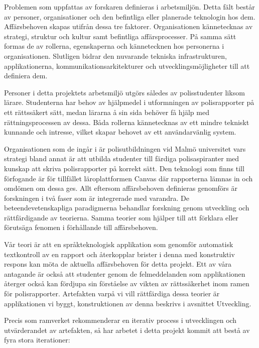 \documentclass[swedish]{maucsthesis}
\begin{document}
Problemen som uppfattas av forskaren definieras i arbetsmiljön. Detta fält
består av personer, organisationer och den befintliga eller planerade teknologin
hos dem. Affärsbehoven skapas utifrån dessa tre faktorer. Organisationen
kännetecknas av strategi, struktur och kultur samt befintliga affärsprocesser.
På samma sätt formas de av rollerna, egenskaperna och kännetecknen hos
personerna i organisationen. Slutligen bidrar den nuvarande tekniska
infrastrukturen, applikationerna, kommunikationsarkitekturer och
utvecklingsmöjligheter till att definiera dem.

Personer i detta projektets arbetsmiljö utgörs således av polisstudenter liksom
lärare. Studenterna har behov av hjälpmedel i utformningen av polisrapporter på
ett rättssäkert sätt, medan lärarna å sin sida behöver få hjälp med
rättningsprocessen av dessa. Båda rollerna kännetecknas av ett mindre tekniskt
kunnande och intresse, vilket skapar behovet av ett användarvänlig system.

Organisationen som de ingår i är polisutbildningen vid Malmö universitet vars
strategi bland annat är att utbilda studenter till färdiga polisaspiranter med
kunskap att skriva polisrapporter på korrekt sätt. Den teknologi som finns till
förfogande är för tillfället läroplattformen Canvas där rapporterna lämnas in
och omdömen om dessa ges. Allt eftersom affärsbehoven definieras genomförs är
forskningen i två faser som är integrerade med varandra. De
beteendevetenskapliga paradigmerna behandlar forskning genom utveckling och
rättfärdigande av teorierna. Samma teorier som hjälper till att förklara eller
förutsäga fenomen i förhållande till affärsbehoven.

Vår teori är att en språkteknologisk applikation som genomför automatisk
textkontroll av en rapport och återkopplar brister i denna med konstruktiv
respons kan möta de aktuella affärsbehoven för detta projekt. Ett av våra
antagande är också att studenter genom de felmeddelanden som applikationen
återger också kan fördjupa sin förståelse av vikten av rättssäkerhet inom ramen
för polisrapporter. Artefakten varpå vi vill rättfärdiga dessa teorier är
applikationen vi byggt, konstruktionen av denna beskrivs i avsnittet Utveckling.

Precis som ramverket rekommenderar en iterativ process i utvecklingen och
utvärderandet av artefakten, så har arbetet i detta projekt kommit att bestå av
fyra stora iterationer:
\end{document}

